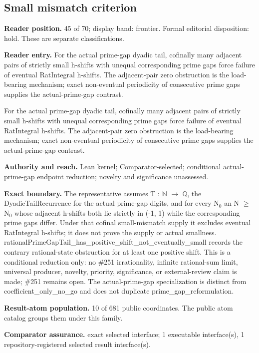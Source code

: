 \documentclass[11pt]{article}
\begin{document}
\subsection{Small mismatch criterion}
\textbf{Reader position.} 45 of 70; display band: frontier.  Formal editorial disposition: hold.  These are separate classifications.

\textbf{Reader entry.} For the actual prime-gap dyadic tail, cofinally many adjacent pairs of strictly small h-shifts with unequal corresponding prime gaps force failure of eventual RatIntegral h-shifts. The adjacent-pair zero obstruction is the load-bearing mechanism; exact non-eventual periodicity of consecutive prime gaps supplies the actual-prime-gap contrast.

For the actual prime-gap dyadic tail, cofinally many adjacent pairs of strictly small h-shifts with unequal corresponding prime gaps force failure of eventual RatIntegral h-shifts. The adjacent-pair zero obstruction is the load-bearing mechanism; exact non-eventual periodicity of consecutive prime gaps supplies the actual-prime-gap contrast.

\textbf{Authority and reach.} Lean kernel; Comparator-selected; conditional actual-prime-gap endpoint reduction; novelty and significance unassessed.

\textbf{Exact boundary.} The representative assumes T : \ensuremath{\mathbb{N}} \ensuremath{\to} \ensuremath{\mathbb{Q}}, the DyadicTailRecurrence for the actual prime-gap digits, and for every N\ensuremath{_{0}} an N \ensuremath{\ge} N\ensuremath{_{0}} whose adjacent h-shifts both lie strictly in (-1, 1) while the corresponding prime gaps differ. Under that cofinal small-mismatch supply it excludes eventual RatIntegral h-shifts; it does not prove the supply or actual smallness. rationalPrimeGapTail\_has\_positive\_shift\_not\_eventually\_small records the contrary rational-state obstruction for at least one positive shift. This is a conditional reduction only: no \#251 irrationality, infinite rational-sum limit, universal producer, novelty, priority, significance, or external-review claim is made; \#251 remains open. The actual-prime-gap specialization is distinct from coefficient\_only\_no\_go and does not duplicate prime\_gap\_reformulation.

\textbf{Result-atom population.} 10 of 681 public coordinates. The public atom catalog groups them under this family.

\textbf{Comparator assurance.} exact selected interface; 1 executable interface(s), 1 repository-registered selected result interface(s).
\end{document}
